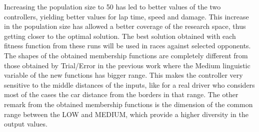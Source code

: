 \documentclass[conference]{IEEEtran}
\begin{document}
Increasing the population size to 50  has led to better values of the
two controllers, yielding better values for lap time, speed and
damage. This increase in the population size has allowed a better
coverage of the research space, thus getting closer to the optimal
solution.  
The best solution obtained with each fitness function from these runs
will be used in races against selected opponents. 
%
The shapes of the obtained membership functions are completely different from
those obtained by Trial/Error in the previous work \cite{evo17}
where the Medium linguistic variable of the new functions has bigger
range. This makes the controller very sensitive to the middle
distances of the inputs, like for a real driver who considers most of
the cases the car distance from the borders in that range. 
The other remark from the obtained  membership functions is the
dimension of the common range between the LOW and MEDIUM, which
provide a higher diversity in the output values. 
\end{document}
